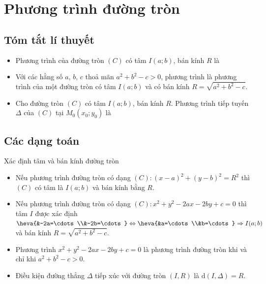 \newpage
\setcounter{dang}{0}
\section{Phương trình đường tròn}
\subsection{Tóm tắt lí thuyết}
\setcounter{ex}{0}
\setcounter{bt}{0}
\begin{itemize}
	\item Phương trình của đường tròn $(C)$ có tâm $I(a;b)$, bán kính $R$ là
	\item Với các hằng số $a$, $b$, $c$ thoả mãn $a^2+b^2-c>0$, phương trình
	là phương trình của một đường tròn có tâm $I(a;b)$ và có bán kính $R=\sqrt{a^2+b^2-c}$.
	\item Cho đường tròn $(C)$ có tâm $I(a;b)$, bán kính $R$. Phương trình tiếp tuyến $\Delta$ của $(C)$ tại $M_0\left(x_0; y_0\right)$ là 
\end{itemize}
\subsection{Các dạng toán}
\begin{dang}{Xác định tâm và bán kính đường tròn}
	\begin{itemize}
		\item Nếu phương trình đường tròn có dạng $(C)\colon \left(x-a\right)^2+\left(y-b\right)^2=R^2$ thì $(C)$ có tâm là $I(a;b)$ và bán kính bằng $R$.
		\item Nếu phương trình đường tròn có dạng $(C)\colon x^2+y^2-2ax-2by+c=0$ thì tâm $I$ được xác định 
		$\heva{&-2a=\cdots\\&-2b=\cdots} \Leftrightarrow \heva{&a=\cdots\\&b=\cdots }\Rightarrow I(a;b)$ và bán kính $R=\sqrt{a^2+b^2-c}$.
	\end{itemize}
	\begin{note}
		\begin{itemize}
			\item Phương trình $x^2+y^2-2ax-2by+c=0$ là phương trình đường tròn khi và chỉ khi $a^2+b^2-c>0$.
			\item Điều kiện đường thẳng $\Delta$ tiếp xúc với đường tròn $(I,R)$ là $\mathrm{d}\left(I,\Delta\right)=R$.
		\end{itemize}
	\end{note}
\end{dang}
